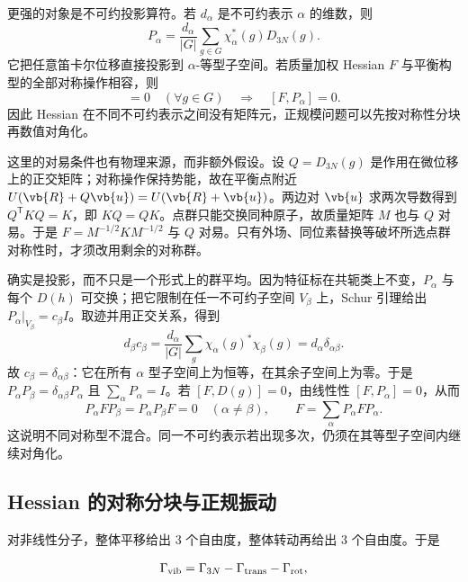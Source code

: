 更强的对象是不可约投影算符。若 $d_\alpha$ 是不可约表示 $\alpha$ 的维数，则
\begin{equation}
P_\alpha
=\frac{d_\alpha}{|G|}
\sum_{g\in G}\chi_\alpha^*(g)D_{3N}(g).
\label{eq:molecular-irrep-projector}
\end{equation}
它把任意笛卡尔位移直接投影到 $\alpha$-等型子空间。若质量加权 Hessian $F$ 与平衡构型的全部对称操作相容，则
\begin{equation}
[F,D_{3N}(g)]=0\quad(\forall g\in G)
\quad\Longrightarrow\quad
[F,P_\alpha]=0.
\label{eq:hessian-symmetry-commutator}
\end{equation}
因此 Hessian 在不同不可约表示之间没有矩阵元，正规模问题可以先按对称性分块再数值对角化。

这里的对易条件也有物理来源，而非额外假设。设 \(Q=D_{3N}(g)\) 是作用在微位移上的正交矩阵；对称操作保持势能，故在平衡点附近 \(U(\vb{R}+Q\vb{u})=U(\vb{R}+\vb{u})\)。两边对 \(\vb{u}\) 求两次导数得到 \(Q^{\mathsf T}KQ=K\)，即 \(KQ=QK\)。点群只能交换同种原子，故质量矩阵 \(M\) 也与 \(Q\) 对易。于是 \(F=M^{-1/2}KM^{-1/2}\) 与 \(Q\) 对易。只有外场、同位素替换等破坏所选点群对称性时，才须改用剩余的对称群。

 确实是投影，而不只是一个形式上的群平均。因为特征标在共轭类上不变，\(P_\alpha\) 与每个 \(D(h)\) 可交换；把它限制在任一不可约子空间 \(V_\beta\) 上，Schur 引理给出 \(P_\alpha|_{V_\beta}=c_\beta I\)。取迹并用正交关系，得到
\[
d_\beta c_\beta
=\frac{d_\alpha}{|G|}\sum_g\chi_\alpha(g)^*\chi_\beta(g)
=d_\alpha\delta_{\alpha\beta}.
\]
故 \(c_\beta=\delta_{\alpha\beta}\)：它在所有 \(\alpha\) 型子空间上为恒等，在其余子空间上为零。于是 \(P_\alpha P_\beta=\delta_{\alpha\beta}P_\alpha\) 且 \(\sum_\alpha P_\alpha=I\)。若 \([F,D(g)]=0\)，由线性性 \([F,P_\alpha]=0\)，从而
\[
P_\alpha F P_\beta=P_\alpha P_\beta F=0\quad(\alpha\ne\beta),
\qquad F=\sum_\alpha P_\alpha F P_\alpha.
\]
这说明不同对称型不混合。同一不可约表示若出现多次，仍须在其等型子空间内继续对角化。

\subsection{Hessian 的对称分块与正规振动}
对非线性分子，整体平移给出 3 个自由度，整体转动再给出 3 个自由度。于是

\begin{equation}
\Gamma_{\rm vib}
=\Gamma_{3N}
-\Gamma_{\rm trans}
-\Gamma_{\rm rot},
\label{eq:vibrational-representation-subtraction}
\end{equation}

